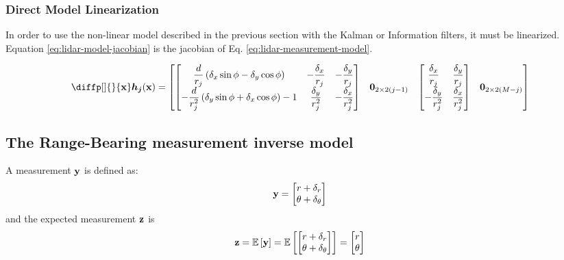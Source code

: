 \documentclass[12pt]{article}
\begin{document}
\subsubsection{Direct Model Linearization}
In order to use the non-linear model described in the previous section with the Kalman or Information filters, it must be linearized. Equation \ref{eq:lidar-model-jacobian} is the jacobian of Eq. \ref{eq:lidar-measurement-model}.

\renewcommand{\arraystretch}{1.5}
\begin{equation}
    \diffp[]{}{\bvec{x}} \mb{h_j}(\bvec{x}) = \begin{bmatrix}
        \begin{bmatrix}
            \dfrac{d}{r_j}\parentheses{\delta_x \sin\phi - \delta_y \cos\phi} &  -\dfrac{\delta_x}{r_j} & -\dfrac{\delta_y}{r_j}\\
            -\dfrac{d}{r_j^2}\parentheses{\delta_y \sin\phi + \delta_x \cos\phi} - 1 & \dfrac{\delta_y}{r_j^2} & -\dfrac{\delta_x}{r_j^2}
        \end{bmatrix} &
        \matnull{2}{2(j-1)} &
        \begin{bmatrix}
            \dfrac{\delta_x}{r_j} & \dfrac{\delta_y}{r_j} \\
            -\dfrac{\delta_y}{r_j^2} & \dfrac{\delta_x}{r_j^2}
        \end{bmatrix} &
        \matnull{2}{2(M-j)} 
    \end{bmatrix} 
    \label{eq:lidar-model-jacobian}
\end{equation}
\renewcommand{\arraystretch}{1.0}

\subsection{The Range-Bearing measurement inverse model}
\label{sec:inv-measurement-model}
A measurement $\boldsymbol{\mathbf{y}}$ is defined as:
\begin{equation}
    \boldsymbol{\mathbf{y}} = \begin{bmatrix}
        r + \delta_r\\ 
        \theta + \delta_\theta \end{bmatrix}
\end{equation}
and the expected measurement $\boldsymbol{\mathbf{z}}$ is
\begin{equation}
    \boldsymbol{\mathbf{z}} = \mathbb{E}\left[\boldsymbol{\mathbf{y}}\right] = \mathbb{E}\left[
        \begin{bmatrix}
        r + \delta_r\\ 
        \theta + \delta_\theta \end{bmatrix}\right] = \begin{bmatrix}
            r \\ \theta
        \end{bmatrix}
\end{equation}
\end{document}
